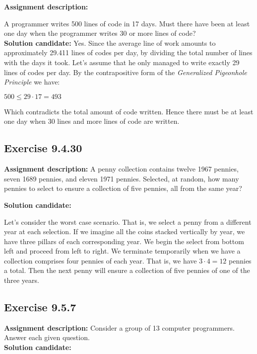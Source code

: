 \documentclass{report}
\newcommand{\cent}[1]{\begin{center}#1\end{center}}
\newcommand{\AssignmentDescription}{\textbf{Assignment description: }}
\newcommand{\Solution}{\textbf{Solution candidate: }}
\newcommand{\Exercise}[1]{\subsection{Exercise #1}}
\begin{document}
 	\AssignmentDescription
 	
 	A programmer writes 500 lines of code in 17 days. Must there have been at least one day when the programmer writes 30 or more lines of code?\\
 	
 	\Solution
 	Yes. Since the average line of work amounts to approximately 29.411 lines of codes per day, by dividing the total number of lines with the days it took. Let's assume that he only managed to write exactly 29 lines of codes per day. By the contrapositive form of the \textit{Generalized Pigeonhole Principle} we have:
 	
 	\cent{$500 \leq  29 \cdot 17 = 493$}
 	
 	Which contradicts the total amount of code written. Hence there must be at least one day when 30 lines and more lines of code are written.
 	
 	
 	
 	\Exercise{9.4.30}
 	
 	\AssignmentDescription
 	A penny collection contains twelve 1967 pennies, seven 1689 pennies, and eleven 1971 pennies. Selected, at random, how many pennies to select to ensure a collection of five pennies, all from the same year?
 	
 	\Solution
 	
 	Let's consider the worst case scenario. That is, we select a penny from a different year at each selection. If we imagine all the coins stacked vertically by year, we have three pillars of each corresponding year. We begin the select from bottom left and proceed from left to right. We terminate temporarily when we have a collection comprises four pennies of each year. That is, we have $3 \cdot 4 = 12$ pennies a total. Then the next penny will ensure a collection of five pennies of one of the three years.\\
 	
 	
 	\Exercise{9.5.7}
 	
 	\AssignmentDescription
 	Consider a group of 13 computer programmers. Answer each given question.\\
 	
 	\Solution
 	
\end{document}
